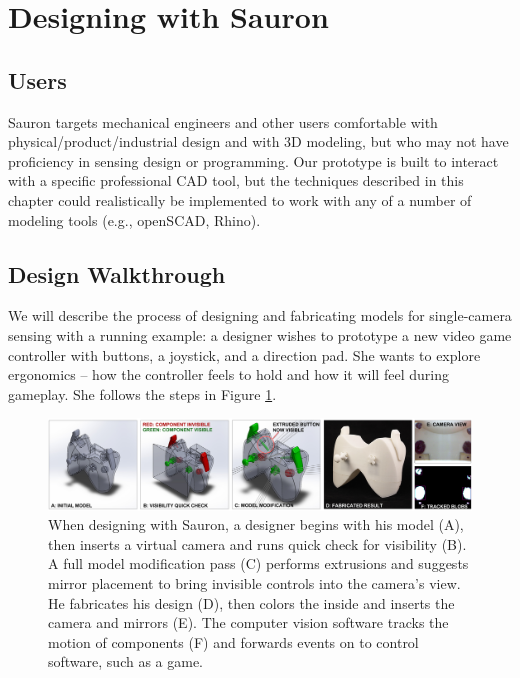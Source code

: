 \section{Designing with Sauron}

    \subsection{Users}
    
    Sauron targets mechanical engineers and other users comfortable with physical/product/industrial design and with 3D modeling, but who may not have proficiency in sensing design or programming. Our prototype is built to interact with a specific professional CAD tool, but the techniques described in this chapter could realistically be implemented to work with any of a number of modeling tools (e.g., openSCAD, Rhino).

    \subsection{Design Walkthrough}
    We will describe the process of designing and fabricating models for single-camera sensing with a running example: a designer wishes to prototype a new video game controller with buttons, a joystick, and a direction pad. She wants to explore ergonomics -- how the controller feels to hold and how it will feel during gameplay. She follows the steps in Figure \ref{fig:sauron-step-by-step}.
    
    
\begin{figure}
\centering
\includegraphics[width=\textwidth]{figures/sauron/fig2-process.jpg}
\caption{When designing with Sauron, a designer begins with his model (A), then inserts a virtual camera and runs quick check for visibility (B).  A full model modification pass (C) performs extrusions and suggests mirror placement to bring invisible controls into the camera's view.  He fabricates his design (D), then colors the inside and inserts the camera and mirrors (E).  The computer vision software tracks the motion of components (F) and forwards events on to control software, such as a game.}
\label{fig:sauron-step-by-step}
\end{figure}


